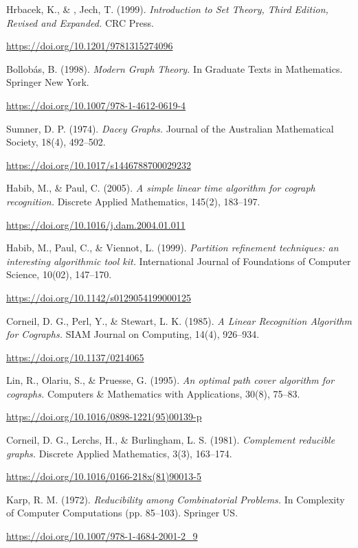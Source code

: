 
\begin{thebibliography}{99}

     Hrbacek, K., \& , Jech, T. (1999).
    \textit{Introduction to Set Theory, Third Edition, Revised and Expanded.} CRC Press.

    \url{https://doi.org/10.1201/9781315274096}

     Bollobás, B. (1998).
    \textit{Modern Graph Theory.}
    In Graduate Texts in Mathematics. Springer New York.

    \url{https://doi.org/10.1007/978-1-4612-0619-4}

     Sumner, D. P. (1974).
    \textit{Dacey Graphs.}
    Journal of the Australian Mathematical Society, 18(4), 492–502.

    \url{https://doi.org/10.1017/s1446788700029232}

     Habib, M., \& Paul, C. (2005).
    \textit{A simple linear time algorithm for cograph recognition.}
    Discrete Applied Mathematics, 145(2), 183–197.

    \url{https://doi.org/10.1016/j.dam.2004.01.011}

     Habib, M., Paul, C., \& Viennot, L. (1999).
    \textit{Partition refinement techniques: an interesting algorithmic tool kit.}
    International Journal of Foundations of Computer Science, 10(02), 147–170.

    \url{https://doi.org/10.1142/s0129054199000125}

     Corneil, D. G., Perl, Y., \& Stewart, L. K. (1985).
    \textit{A Linear Recognition Algorithm for Cographs.}
    SIAM Journal on Computing, 14(4), 926–934.

    \url{https://doi.org/10.1137/0214065}

     Lin, R., Olariu, S., \& Pruesse, G. (1995).
    \textit{An optimal path cover algorithm for cographs.}
    Computers \& Mathematics with Applications, 30(8), 75–83.

    \url{https://doi.org/10.1016/0898-1221(95)00139-p}

     Corneil, D. G., Lerchs, H., \& Burlingham, L. S. (1981).
    \textit{Complement reducible graphs.}
    Discrete Applied Mathematics, 3(3), 163–174.

    \url{https://doi.org/10.1016/0166-218x(81)90013-5}

     Karp, R. M. (1972).
    \textit{Reducibility among Combinatorial Problems. }
    In Complexity of Computer Computations (pp. 85–103). Springer US.

    \url{https://doi.org/10.1007/978-1-4684-2001-2_9}

\end{thebibliography}
